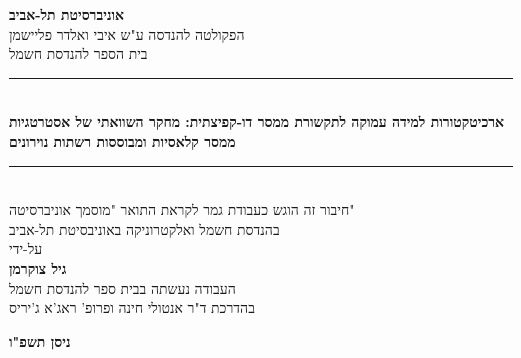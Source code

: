 \documentclass[12pt,a4paper,oneside]{book}
\theoremstyle{definition}
\begin{document}
\begin{titlepage}
\begin{center}
\vspace*{0.5cm}
\begin{otherlanguage}{hebrew}

{\LARGE\textbf{אוניברסיטת תל-אביב}}\\[6pt]
{\large הפקולטה להנדסה ע"ש איבי ואלדר פליישמן}\\[4pt]
{\large בית הספר להנדסת חשמל}\\[1.5cm]

\noindent\rule{\textwidth}{2pt}\\[0.4cm]
{\LARGE\bfseries
ארכיטקטורות למידה עמוקה לתקשורת ממסר דו-קפיצתית: מחקר השוואתי של אסטרטגיות ממסר קלאסיות ומבוססות רשתות נוירונים}\\[6pt]
\noindent\rule{\textwidth}{2pt}\\[1.2cm]

{\large חיבור זה הוגש כעבודת גמר לקראת התואר "מוסמך אוניברסיטה"}\\[4pt]
{\large בהנדסת חשמל ואלקטרוניקה באוניבסיטת תל-אביב}\\[1.5cm]

{\large על-ידי}\\[6pt]
{\Large\bfseries גיל צוקרמן}\\[1.5cm]

{\small העבודה נעשתה בבית ספר להנדסת חשמל \\
בהדרכת ד"ר אנטולי חינה ופרופ' ראג'א ג'יריס}\\
 
\vfill

{\large\textbf{ניסן תשפ"ו}}\\[1.5cm]

\end{otherlanguage}
\end{center}
\end{titlepage}

\backmatter

\end{document}
